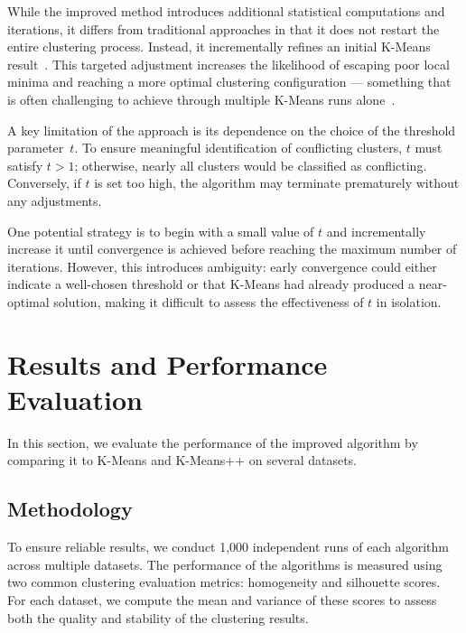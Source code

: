 \documentclass[10pt,twocolumn,letterpaper]{article}
\begin{document}
While the improved method introduces additional statistical computations and
iterations, it differs from traditional approaches in that it does not restart
the entire clustering process. Instead, it incrementally refines an initial
K-Means result~\cite{Abdullah10601123}. This targeted adjustment increases the
likelihood of escaping poor local minima and reaching a more optimal clustering
configuration — something that is often challenging to achieve through multiple
K-Means runs alone~\cite{FRANTI201995}.

A key limitation of the approach is its dependence on the choice of the
threshold parameter~$t$. To ensure meaningful identification of conflicting
clusters, $t$ must satisfy $t > 1$; otherwise, nearly all clusters would be
classified as conflicting. Conversely, if $t$ is set too high, the algorithm
may terminate prematurely without any adjustments.

One potential strategy is to begin with a small value of $t$ and incrementally
increase it until convergence is achieved before reaching the maximum number of
iterations. However, this introduces ambiguity: early convergence could either
indicate a well-chosen threshold or that K-Means had already produced a
near-optimal solution, making it difficult to assess the effectiveness of $t$
in isolation.



\section{Results and Performance Evaluation}\label{sec:results-and-performance-evaluation}

In this section, we evaluate the performance of the improved algorithm by
comparing it to K-Means and K-Means++ on several datasets.


\subsection{Methodology}\label{subsec:methodology}

To ensure reliable results, we conduct 1,000 independent runs of each algorithm
across multiple datasets. The performance of the algorithms is measured using
two common clustering evaluation metrics: homogeneity and silhouette scores.
For each dataset, we compute the mean and variance of these scores to assess
both the quality and stability of the clustering results.
\end{document}
